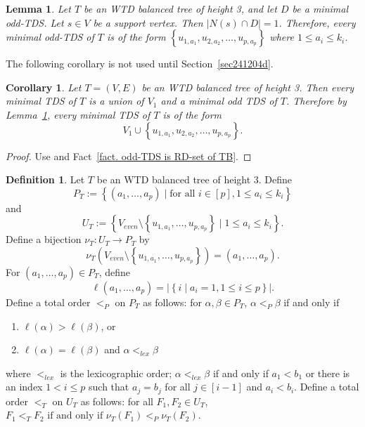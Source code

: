 \documentclass[12pt, reqno]{amsart}
\theoremstyle{definition}
\theoremstyle{plain}
\newtheorem{lemma}[theorem]{Lemma}
\newtheorem{corollary}[theorem]{Corollary}
\theoremstyle{definition}
\newtheorem{definition}[theorem]{Definition}
\newcommand\Set[2]{\left\lbrace #1 \mid #2 \right\rbrace}
\newcommand\set[1]{\left\lbrace #1 \right\rbrace}
\begin{document}
\begin{lemma}\label{lem. |N(s) cap D| = 1}
    Let $T$ be an WTD balanced tree of height 3, and let $D$ be a minimal odd-TDS.
    Let $s \in V$ be a support vertex.
    Then $|N(s) \cap D| = 1$.
    Therefore, every minimal odd-TDS of $T$ is of the form
    $\set{u_{1,a_1},u_{2,a_2},\dots,u_{p,a_{p}}}$
where $1 \leq a_i \leq k_i$.
\end{lemma}

The following corollary is not used until Section~\ref{sec241204d}.

\begin{corollary}\label{cor. TDS = V_1 U odd TDS}
    Let $T = (V,E)$ be an WTD balanced tree of height 3.
    Then every minimal TDS of $T$ is a union of $V_1$ and a minimal odd TDS of $T$.
    Therefore by Lemma~\ref{lem. |N(s) cap D| = 1}, every minimal TDS of $T$ is of the form
    $$
    V_1 \cup \set{u_{1,a_1},u_{2,a_2},\dots,u_{p,a_{p}}}.
    $$
\end{corollary}

\begin{proof}
    Use \cite[Lemma 5.7]{COURAGE_GT}
    and Fact~\ref{fact. odd-TDS is RD-set of TB}.
\end{proof}

\begin{definition}\label{def. bijection between facets and vectors}
    Let $T$ be an WTD balanced tree of height 3.
    Define
    $$
    P_T := \Set{(a_1,\dots,a_{p})}{\text{for all } i \in [p], 1 \leq a_i \leq k_i}
    $$
    and     
    $$  
    U_T  := \Set{V_{even} \setminus \set{u_{1,a_1},\dots,u_{p,a_{p}}}}{1 \leq a_i \leq k_i}.
    $$
    Define a bijection $\nu_T: U_T  \to P_T$ by
    $$
    \nu_T(V_{even}\setminus \set{u_{1,a_1},\dots,u_{p,a_p}}) = (a_1,\dots,a_p).
    $$
    For $(a_1,\dots,a_p) \in P_T$, define
    $$
    \ell(a_1,\dots,a_p) = |\Set{i}{a_i = 1, 1 \leq i \leq p}|.
    $$
    Define a total order $<_P$ on $P_T$ as follows:
    for $\alpha,\beta \in P_T$, $\alpha <_P \beta$
    if and only if
    \begin{enumerate}
        \item $\ell(\alpha) > \ell(\beta)$, or
        \item $\ell(\alpha) = \ell(\beta)$ and $\alpha <_{lex} \beta$
    \end{enumerate}
    where $<_{lex}$ is the lexicographic order; $\alpha <_{lex} \beta$ if and only if $a_1 < b_1$ or there is an index $1 < i \leq p$ such that  $a_j = b_j$ for all $j \in [i-1]$ and $a_i < b_i$.
    Define a total order $<_T$ on $U_T $ as follows: for all $F_1,F_2 \in U_T $, 
    $F_1 <_T F_2 \text{ if and only if } \nu_T(F_1) <_P \nu_T(F_2)$.
\end{definition}
\end{document}
